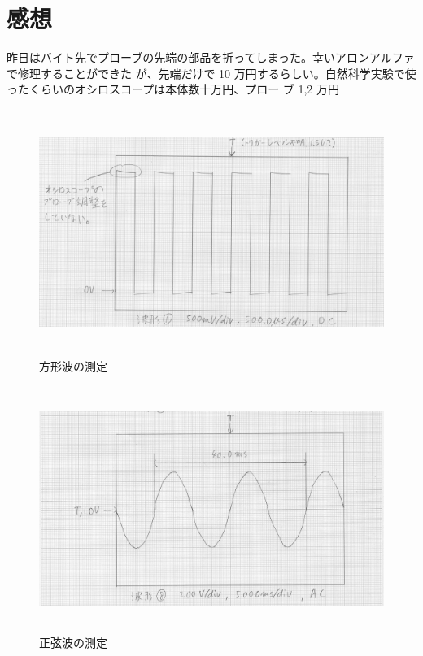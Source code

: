 \documentclass{ltjsarticle}
\begin{document}
\section*{感想}
昨日はバイト先でプローブの先端の部品を折ってしまった。幸いアロンアルファで修理することができた
が、先端だけで 10 万円するらしい。自然科学実験で使ったくらいのオシロスコープは本体数十万円、プロー
ブ 1,2 万円

\begin{figure}[p]
    \centering
    \includegraphics[height=8cm]{sq_wave.jpg}
    \caption{方形波の測定}
\end{figure}

\begin{figure}[p]
    \centering
    \includegraphics[height=8cm]{sine_wave.jpg}
    \caption{正弦波の測定}
\end{figure}
\end{document}
